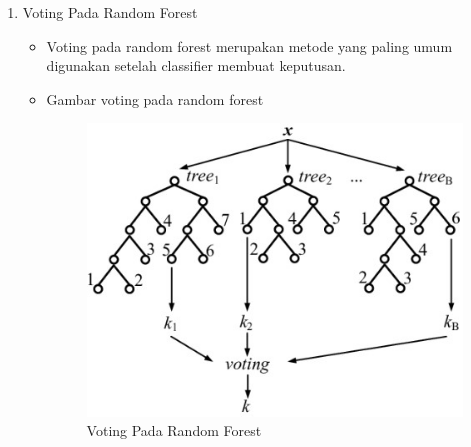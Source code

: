 \begin{enumerate}
\item Voting Pada Random Forest
	\begin{itemize}
		\item Voting pada random forest merupakan metode yang paling umum digunakan setelah classifier membuat keputusan.
		\item Gambar voting pada random forest
			\begin{figure}[!hbtp]
			\centering
			\includegraphics[scale=0.5]{figures/j3.jpg}
			\caption{Voting Pada Random Forest}
			\label{contoh}
			\end{figure}
	\end{itemize}

\end{enumerate}

